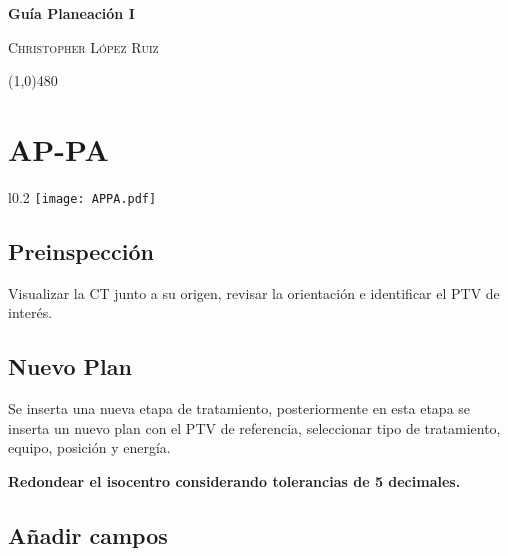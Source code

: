 \documentclass{article}
\begin{document}
\centerline{\Large \textbf{\textcolor{Grayo}{Guía Planeación I}}}
\vspace{2mm}
\centerline{\large \textsc{Christopher López Ruiz}}

\vspace{-10pt}

\begin{center}
\line(1,0){480}
\end{center}



\vspace{3pt}
%

\section*{AP-PA}

\begin{wrapfigure}{l}{0.2\textwidth}
    \centering
    \texttt{[image: APPA.pdf]}
\end{wrapfigure}

\subsection*{Preinspección}

Visualizar la CT junto a su origen, revisar la orientación e identificar el PTV de interés.

\subsection*{Nuevo Plan}

Se inserta una nueva etapa de tratamiento, posteriormente en esta etapa se inserta un nuevo plan con el PTV de referencia, seleccionar tipo de tratamiento, equipo, posición y energía. 

\textbf{Redondear el isocentro considerando tolerancias de 5 decimales.}

\subsection*{Añadir campos}
\end{document}
